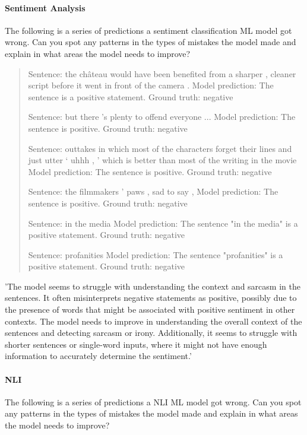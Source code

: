 \paragraph{Sentiment Analysis}
The following is a series of predictions a sentiment classification ML model got wrong. Can you spot any patterns in the types of mistakes the model made and explain in what areas the model needs to improve?

\begin{quote}
    

Sentence:
the château would have been benefited from a sharper , cleaner script before it went in front of the camera . 
Model prediction: The sentence is a positive statement.
Ground truth: negative

Sentence:
but there 's plenty to offend everyone ... 
Model prediction: The sentence is positive.
Ground truth: negative

Sentence:
outtakes in which most of the characters forget their lines and just utter ` uhhh , ' which is better than most of the writing in the movie 
Model prediction: The sentence is positive.
Ground truth: negative


Sentence:
the filmmakers ' paws , sad to say , 
Model prediction: The sentence is positive.
Ground truth: negative


Sentence:
in the media 
Model prediction: The sentence "in the media" is a positive statement.
Ground truth: negative


Sentence:
profanities 
Model prediction: The sentence "profanities" is a positive statement.
Ground truth: negative

\end{quote}

'The model seems to struggle with understanding the context and sarcasm in the sentences. It often misinterprets negative statements as positive, possibly due to the presence of words that might be associated with positive sentiment in other contexts. The model needs to improve in understanding the overall context of the sentences and detecting sarcasm or irony. Additionally, it seems to struggle with shorter sentences or single-word inputs, where it might not have enough information to accurately determine the sentiment.'


\paragraph{NLI}
The following is a series of predictions a NLI ML model got wrong. Can you spot any patterns in the types of mistakes the model made and explain in what areas the model needs to improve?


